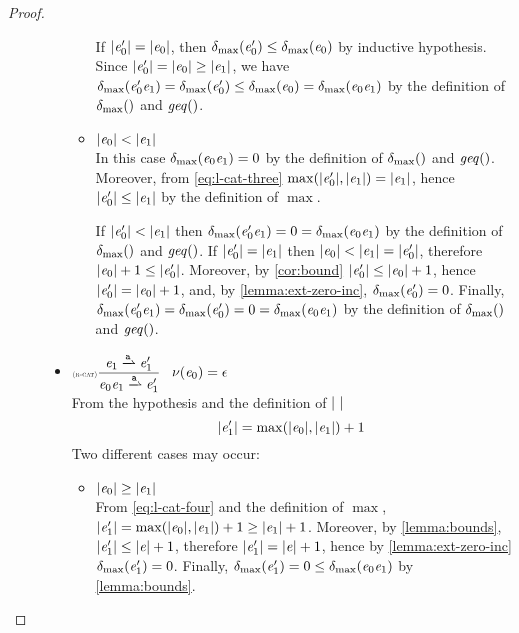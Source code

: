 \begin{proof}
\begin{description}
\begin{itemize}
\begin{itemize}
                 If ${\mid}{\mathit {e}_0'}{\mid}={\mid}{\mathit {e}_0}{\mid}$, then ${\delta_{\max}}({\mathit {e}_0'})\leq{\delta_{\max}}({\mathit {e}_0})$ by inductive hypothesis. Since ${\mid}{\mathit {e}_0'}{\mid}={\mid}{\mathit {e}_0}{\mid}\geq{\mid}{\ensuremath{\mathit {e}}_1}{\mid}$, we have ${\delta_{\max}}({\mathit {e}_0'\mathit {e}_1})={\delta_{\max}}({\mathit {e}_0'})\leq{\delta_{\max}}({\mathit {e}_0})={\delta_{\max}}({\mathit {e}_0\mathit {e}_1})$ by the definition of ${\delta_{\max}}({})$ and $\mathit{geq}()$.
           \item ${\mid}{\mathit {e}_0}{\mid}<{\mid}{\mathit {e}_1}{\mid}$\\
                 In this case ${\delta_{\max}}({\mathit {e}_0\mathit {e}_1})=0$ by the definition of ${\delta_{\max}}({})$ and $\mathit{geq}()$. Moreover, from \cref{eq:l-cat-three} $\max({\mid}{\mathit {e}_0'}{\mid},{\mid}{\mathit {e}_1}{\mid})={\mid}{\mathit {e}_1}{\mid}$, hence ${\mid}{\mathit {e}_0'}{\mid}\leq{\mid}{\ensuremath{\mathit {e}}_1}{\mid}$ by the definition of $\max$.

                 If ${\mid}{\mathit {e}_0'}{\mid}<{\mid}{\mathit {e}_1}{\mid}$ then ${\delta_{\max}}({\mathit {e}_0'\mathit {e}_1})=0={\delta_{\max}}({\mathit {e}_0\mathit {e}_1})$ by the definition of ${\delta_{\max}}({})$ and $\mathit{geq}()$. If ${\mid}{\mathit {e}_0'}{\mid}={\mid}{\mathit {e}_1}{\mid}$ then ${\mid}{\mathit {e}_0}{\mid}<{\mid}{\mathit {e}_1}{\mid}={\mid}{\mathit {e}_0'}{\mid}$, therefore ${\mid}{\mathit {e}_0}{\mid}+1\leq{\mid}{\ensuremath{\mathit {e}}_0'}{\mid}$. Moreover, by \cref{cor:bound} ${\mid}{\mathit {e}'_0}{\mid}\leq{\mid}{\ensuremath{\mathit {e}}_0}{\mid}+1$, hence ${\mid}{\mathit {e}_0'}{\mid}={\mid}{\mathit {e}_0}{\mid}+1$, and, by \cref{lemma:ext-zero-inc}, ${\delta_{\max}}({\mathit {e}_0'})=0$. Finally,
                 ${\delta_{\max}}({\mathit {e}_0'\mathit {e}_1})={\delta_{\max}}({\mathit {e}_0'})=0={\delta_{\max}}({\mathit {e}_0\mathit {e}_1})$ by the definition of ${\delta_{\max}}({})$ and $\mathit{geq}()$.
          \end{itemize}

    \item $\Rule{r-cat}{\re_1\parDer{\sym}\re'_1}{\re_0\catop\re_1\parDer{\sym}\re'_1}{\hasEps{\re_0}=\eps}$\\[2ex]
          From the hypothesis and the definition of ${\mid}{\ }{\mid}$
          \begin{equation}
           \label{eq:l-cat-four}
           {\mid}{\ensuremath{\mathit {e}}_1'}{\mid}=\max({\mid}{\mathit {e}_0}{\mid},{\mid}{\mathit {e}_1}{\mid})+1
          \end{equation}
          Two different cases may occur:
          \begin{itemize}
           \item ${\mid}{\mathit {e}_0}{\mid}\geq{\mid}{\ensuremath{\mathit {e}}_1}{\mid}$\\
                 From \cref{eq:l-cat-four} and the definition of $\max$, ${\mid}{\mathit {e}_1'}{\mid}=\max({\mid}{\mathit {e}_0}{\mid},{\mid}{\mathit {e}_1}{\mid})+1\geq{\mid}{\ensuremath{\mathit {e}}_1}{\mid}+1$. Moreover, by \cref{lemma:bounds},
                 ${\mid}{\mathit {e}_1'}{\mid}\leq{\mid}{\ensuremath{\mathit {e}}}{\mid}+1$, therefore ${\mid}{\mathit {e}_1'}{\mid}={\mid}{\mathit {e}}{\mid}+1$, hence by \cref{lemma:ext-zero-inc} ${\delta_{\max}}({\mathit {e}_1'})=0$.
                 Finally, ${\delta_{\max}}({\mathit {e}_1'})=0\leq{\delta_{\max}}({\mathit {e}_0\mathit {e}_1})$ by \cref{lemma:bounds}.


\end{itemize}
\end{itemize}
\end{description}
\end{proof}
